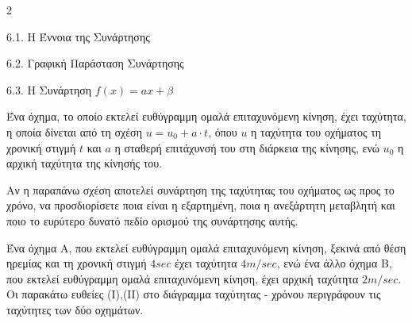 \begin{ylh}{2}
    \item 6.1. Η Έννοια της Συνάρτησης
    \item 6.2. Γραφική Παράσταση Συνάρτησης
    \item 6.3. Η Συνάρτηση $f(x)=ax+\beta$
\end{ylh}

Ένα όχημα, το οποίο εκτελεί ευθύγραμμη ομαλά επιταχυνόμενη κίνηση, έχει ταχύτητα, η οποία δίνεται από τη σχέση $u = u_{0} + a \cdot t$, όπου $u$ η ταχύτητα του οχήματος τη χρονική στιγμή $t$ και $a$ η σταθερή επιτάχυνσή του στη διάρκεια της κίνησης, ενώ $u_{0}$ η αρχική ταχύτητα της κίνησής του.
\begin{alist}
\item Αν η παραπάνω σχέση αποτελεί συνάρτηση της ταχύτητας του οχήματος ως προς το χρόνο, να προσδιορίσετε ποια είναι η εξαρτημένη, ποια η ανεξάρτητη μεταβλητή και ποιο το ευρύτερο δυνατό πεδίο ορισμού της συνάρτησης αυτής.
\item Ένα όχημα Α, που εκτελεί ευθύγραμμη ομαλά επιταχυνόμενη κίνηση, ξεκινά από θέση ηρεμίας και τη χρονική στιγμή $4 \si{sec}$ έχει ταχύτητα $4 \si{m/sec}$, ενώ ένα άλλο όχημα Β, που εκτελεί ευθύγραμμη ομαλά επιταχυνόμενη κίνηση, έχει αρχική ταχύτητα $2 \si{m/sec}$. Οι παρακάτω ευθείες (Ι),(ΙΙ) στο διάγραμμα ταχύτητας - χρόνου περιγράφουν τις ταχύτητες των δύο οχημάτων.
\begin{center}
\end{center}


\end{alist}
